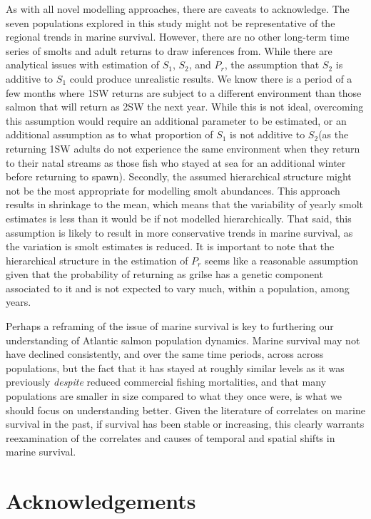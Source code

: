 \documentclass[12pt]{article}
\newcommand{\So}{$S_{1}$\xspace}
\newcommand{\St}{$S_{2}$\xspace}
\newcommand{\Pg}{$P_r$\xspace}
\begin{document}
As with all novel modelling approaches, there are caveats to acknowledge.
The seven populations explored in this study might not be representative
of the regional trends in marine survival. However, there are no other
long-term time series of smolts and adult returns to draw inferences from.
While there are analytical issues with estimation of \So, \St, and \Pg,
the assumption that \St is additive to \So could produce unrealistic results.
We know there is a period of a few months where 1SW
returns are subject to a different environment than those salmon that will
return as 2SW the next year. 
While this is not ideal,
overcoming this assumption would require an additional parameter to be
estimated, or an additional assumption as to what proportion of \So is not
additive to \St (as the returning 1SW adults do not experience the same
environment when they return to their natal streams as those fish who stayed
at sea for an additional winter before returning to spawn).
Secondly, the assumed hierarchical structure might not be the most appropriate
for modelling smolt abundances. This approach results in shrinkage to the
mean, which means that the variability of yearly smolt estimates is less than
it would be if not modelled hierarchically. 
That said, this assumption is likely to result in more conservative trends in marine survival, as the
variation is smolt estimates is reduced.
It is important to note that the hierarchical structure in the estimation of
\Pg seems like a reasonable assumption given that the probability of returning
as grilse has a genetic component associated to it \citep{Aykanat2019} and is
not expected to vary much, within a population, among years.

Perhaps a reframing of the issue of marine survival is key to furthering our
understanding of Atlantic salmon population dynamics. Marine
survival may not have declined consistently, and over the same time periods, across across populations, but the fact that it has stayed at
roughly similar levels as it was previously \emph{despite} reduced commercial fishing mortalities,
and that many populations are smaller in size compared to what they once were, is
what we should focus on understanding better.
Given the literature of correlates on marine survival in the past, if survival
has been stable or increasing, this clearly warrants reexamination of the
correlates and causes of temporal and spatial shifts in marine survival.



\section*{Acknowledgements}
\end{document}
